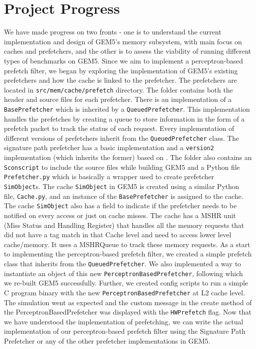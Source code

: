 \documentclass[conference]{IEEEtran}
\begin{document}
\section{Project Progress}

We have made progress on two fronts - one is to understand the current implementation and design of GEM5's memory subsystem, with main focus on caches and prefetchers, and the other is to assess the viability of running different types of benchmarks on GEM5. Since we aim to implement a perceptron-based prefetch filter, we began by exploring the implementation of GEM5's existing prefetchers and how the cache is linked to the prefetcher. The prefetchers are located in \texttt{src/mem/cache/prefetch} directory. The folder contains both the header and source files for each prefetcher. There is an implementation of a \texttt{BasePrefetcher} which is inherited by a \texttt{QueuedPrefetcher}. This implementation handles the prefetches by creating a queue to store information in the form of a prefetch packet to track the status of each request. Every implementation of different versions of prefetchers inherit from the \texttt{QueuedPrefetcher} class. The signature path prefetcher has a basic implementation and a \texttt{version2} implementation (which inherits the former) based on \cite{SPP}. The folder also contains an \texttt{Sconscript} to include the source files while building GEM5 and a Python file \texttt{Prefetcher.py} which is basically a wrapper used to create prefetcher \texttt{SimObject}s. The cache \texttt{SimObject} in GEM5 is created using a similar Python file, \texttt{Cache.py}, and an instance of the \texttt{BasePrefetcher} is assigned to the cache. The cache \texttt{SimObject} also has a field to indicate if the prefetcher needs to be notified on every access or just on cache misses. The cache has a MSHR unit (Miss Status and Handling Register) that handles all the memory requests that did not have a tag match in that Cache level and need to access lower level cache/memory. It uses a MSHRQueue to track these memory requests. As a start to implementing the perceptron-based prefetch filter, we created a simple prefetch class that inherits from the \texttt{QueuedPrefetcher}. We also implemented a way to instantiate an object of this new \texttt{PerceptronBasedPrefetcher}, following which we re-built GEM5 successfully. Further, we created config scripts to run a simple C program binary with the new \texttt{PerceptronBasedPrefetcher} at L2 cache level. The simulation went as expected and the custom message in the create method of the PerceptronBasedPrefetcher was displayed with the \texttt{HWPrefetch} flag. Now that we have understood the implementation of prefetching, we can write the actual implementation of our perceptron-based prefetch filter using the Signature Path Prefetcher or any of the other prefetcher implementations in GEM5. 
\end{document}
